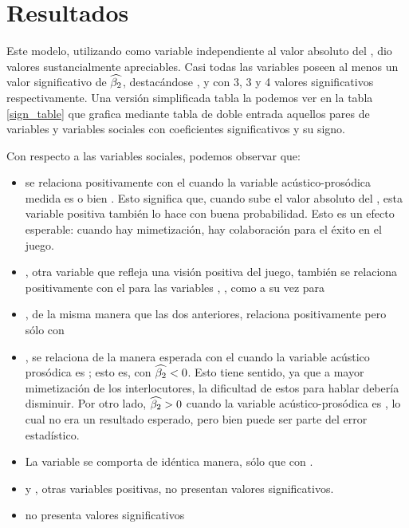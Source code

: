 \section{Resultados}


Este modelo, utilizando como variable independiente al valor absoluto del \entrainment, dio valores sustancialmente apreciables. Casi todas las variables \ap poseen al menos un valor significativo de $\widehat{\beta_2}$, destacándose \ENGMEAN, \NOISETOHARMONICS y \FOMEAN  con 3, 3 y 4 valores significativos respectivamente. Una versión simplificada tabla la podemos ver en la tabla \ref{sign_table} que grafica mediante tabla de doble entrada aquellos pares de variables \ap y variables sociales con coeficientes significativos y su signo.

Con respecto a las variables sociales, podemos observar que:

\begin{itemize}
  \item \svcontributes se relaciona positivamente con el \absentrainment cuando la variable acústico-prosódica medida es \FOMEAN o bien \NOISETOHARMONICS. Esto significa que, cuando sube el valor absoluto del \entrainment, esta variable positiva también lo hace con buena probabilidad. Esto es un efecto esperable: cuando hay mimetización, hay colaboración para el éxito en el juego.
  \item \svclear, otra variable que refleja una visión positiva del juego, también se relaciona positivamente con el \absentrainment para las variables \FOMEAN, \NOISETOHARMONICS, \ENGMAX como a su vez para \PHONAVG
  \item \svengaged, de la misma manera que las dos anteriores, relaciona positivamente pero sólo con \FOMEAN
  \item \svdifficult, se relaciona de la manera esperada con el \absentrainment cuando la variable acústico prosódica es \ENGMAX; esto es, con $\widehat{\beta_2} < 0$. Esto tiene sentido, ya que a mayor mimetización de los interlocutores, la dificultad de estos para hablar debería disminuir. Por otro lado, $\widehat{\beta_2} > 0$ cuando la variable acústico-prosódica es \ENGMEAN, lo cual no era un resultado esperado, pero bien puede ser parte del error estadístico.
  \item La variable \svbored se comporta de idéntica manera, sólo que con \FOMEAN.
  \item \svplanning y \svencourages, otras variables positivas, no presentan valores significativos.
  \item \svdislikes no presenta valores significativos
\end{itemize}


